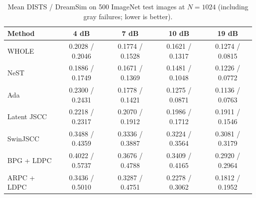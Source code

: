 \documentclass[10pt,letterpaper]{article}
\begin{document}
\begin{table}[htbp]
\centering
\caption{Mean DISTS / DreamSim on 500 ImageNet test images at $N=1024$ (including gray failures; lower is better).}
\label{tab:s4}
\small
\begin{tabular}{@{}lcccc@{}}
\toprule
Method & 4 dB & 7 dB & 10 dB & 19 dB\\
\midrule
WHOLE       & 0.2028 / 0.2046 & 0.1774 / 0.1528 & 0.1621 / 0.1317 & 0.1274 / 0.0815\\
NeST        & 0.1886 / 0.1749 & 0.1671 / 0.1369 & 0.1481 / 0.1048 & 0.1226 / 0.0772\\
Ada         & 0.2300 / 0.2431 & 0.1778 / 0.1421 & 0.1275 / 0.0871 & 0.1136 / 0.0763\\
Latent JSCC & 0.2218 / 0.2317 & 0.2070 / 0.1912 & 0.1986 / 0.1712 & 0.1911 / 0.1546\\
SwinJSCC    & 0.3488 / 0.4359 & 0.3336 / 0.3887 & 0.3224 / 0.3564 & 0.3081 / 0.3179\\
BPG + LDPC  & 0.4022 / 0.5737 & 0.3676 / 0.4788 & 0.3409 / 0.4165 & 0.2920 / 0.2964\\
ARPC + LDPC & 0.3436 / 0.5010 & 0.3287 / 0.4751 & 0.2278 / 0.3062 & 0.1812 / 0.1952\\
\bottomrule
\end{tabular}
\end{table}
\end{document}

